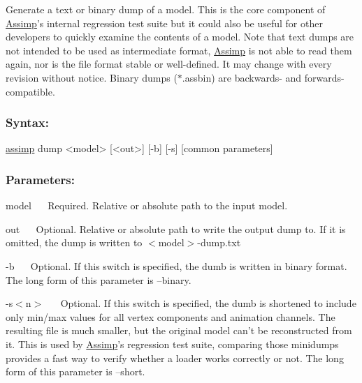 Generate a text or binary dump of a model. This is the core component of \hyperlink{class_assimp}{Assimp}'s internal regression test suite but it could also be useful for other developers to quickly examine the contents of a model. Note that text dumps are not intended to be used as intermediate format, \hyperlink{class_assimp}{Assimp} is not able to read them again, nor is the file format stable or well-\/defined. It may change with every revision without notice. Binary dumps ($\ast$.assbin) are backwards-\/ and forwards-\/compatible.

\subsubsection*{Syntax\+:}


\begin{DoxyCode}
\hyperlink{namespaceassimp}{assimp} dump <model> [<out>] [-b] [-s] [common parameters]
\end{DoxyCode}


\subsubsection*{Parameters\+:}

{\ttfamily  model~\newline
}~\newline
 Required. Relative or absolute path to the input model. 

{\ttfamily  out~\newline
}~\newline
 Optional. Relative or absolute path to write the output dump to. If it is omitted, the dump is written to {\ttfamily $<$model$>$-\/dump.\+txt} 

{\ttfamily -\/b~\newline
 }~\newline
 Optional. If this switch is specified, the dumb is written in binary format. The long form of this parameter is {\ttfamily --binary}. 

{\ttfamily -\/s$<$n$>$~\newline
 }~\newline
 Optional. If this switch is specified, the dumb is shortened to include only min/max values for all vertex components and animation channels. The resulting file is much smaller, but the original model can't be reconstructed from it. This is used by \hyperlink{class_assimp}{Assimp}'s regression test suite, comparing those minidumps provides a fast way to verify whether a loader works correctly or not. The long form of this parameter is {\ttfamily --short}. 

